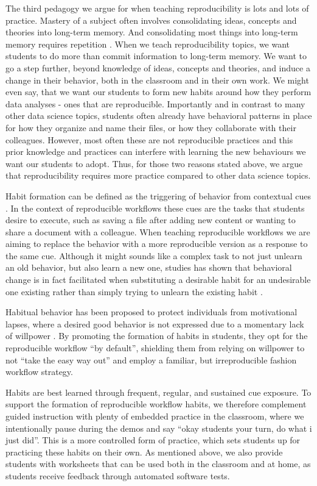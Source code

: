 \documentclass[
  12 pt,
]{paper}
\begin{document}
The third pedagogy we argue for when teaching reproducibility is lots
and lots of practice.
Mastery of a subject often involves consolidating ideas, concepts
and theories into long-term memory.
And consolidating most things into long-term memory
requires repetition \autocite{ebbinghaus1913memory}.
When we teach reproducibility topics,
we want students to do more than commit information to long-term memory.
We want to go a step further, beyond knowledge of ideas, concepts and theories,
and induce a change in their behavior,
both in the classroom and in their own work.
We might even say, that we want our students to form new
habits around how they perform data analyses - ones that are reproducible.
Importantly and in contrast to many other data science topics,
students often already have behavioral patterns in place for how they organize
and name their files, or how they collaborate with their colleagues.
However, most often these are not reproducible practices
and this prior knowledge
and practices can interfere with learning the new behaviours
we want our students to adopt.
Thus, for those two reasons stated above,
we argue that reproducibility requires more practice compared to other
data science topics.

Habit formation can be defined as the triggering of behavior from contextual cues \autocite{rebar_gardner_2019}.
In the context of reproducible workflows these cues
are the tasks that students desire to execute,
such as saving a file after adding new content
or wanting to share a document with a colleague.
When teaching reproducible workflows
we are aiming to replace the behavior with a more reproducible version
as a response to the same cue.
Although it might sounds like a complex task to not just unlearn an old behavior,
but also learn a new one,
studies has shown that behavioral change is in fact facilitated
when substituting a desirable habit for an undesirable one existing
rather than simply trying to unlearn the existing habit
\autocite{evers_adriaanse_2011}.

Habitual behavior has been proposed to protect individuals from motivational lapses,
where a desired good behavior is not expressed
due to a momentary lack of willpower \autocite{rebar_gardner_2019}.
By promoting the formation of habits in students,
they opt for the reproducible workflow ``by default'',
shielding them from relying on willpower to not ``take the easy way out''
and employ a familiar, but irreproducible fashion workflow strategy.

Habits are best learned through frequent, regular, and sustained cue exposure.
To support the formation of reproducible workflow habits,
we therefore complement guided instruction
with plenty of embedded practice in the classroom,
where we intentionally pause during the demos
and say ``okay students your turn, do what i just did''.
This is a more controlled form of practice,
which sets students up for practicing these habits on their own.
As mentioned above,
we also provide students with worksheets
that can be used both in the classroom and at home,
as students receive feedback through automated software tests.
\end{document}
